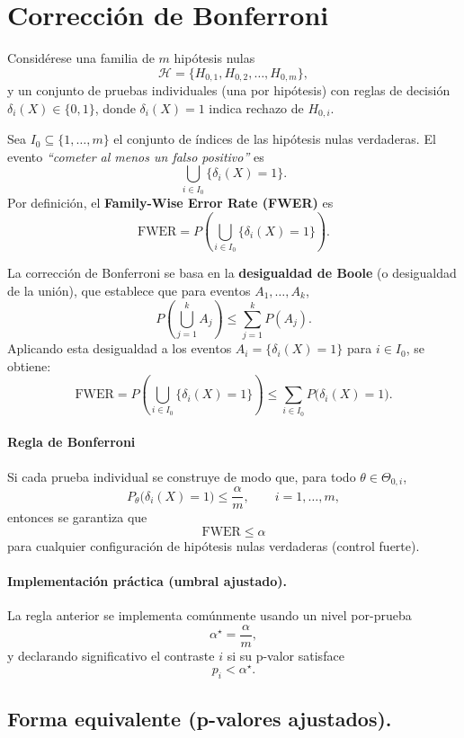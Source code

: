 \section{Correcci\'on de Bonferroni}

Consid\'erese una familia de $m$ hip\'otesis nulas
\[
\mathcal{H}=\{H_{0,1},H_{0,2},\dots,H_{0,m}\},
\]
y un conjunto de pruebas individuales (una por hip\'otesis) con reglas de decisi\'on $\delta_i(X)\in\{0,1\}$, donde $\delta_i(X)=1$ indica rechazo de $H_{0,i}$.

Sea $I_0\subseteq\{1,\dots,m\}$ el conjunto de \'indices de las hip\'otesis nulas verdaderas. El evento \emph{``cometer al menos un falso positivo''} es
\[
\bigcup_{i\in I_0}\{\delta_i(X)=1\}.
\]
Por definici\'on, el \textbf{Family-Wise Error Rate (FWER)} es
\[
\mathrm{FWER}
=
P\!\left(\bigcup_{i\in I_0}\{\delta_i(X)=1\}\right).
\]

La correcci\'on de Bonferroni se basa en la \textbf{desigualdad de Boole} (o desigualdad de la uni\'on), que establece que para eventos $A_1,\dots,A_k$,
\[
P\!\left(\bigcup_{j=1}^k A_j\right)\le \sum_{j=1}^k P(A_j).
\]
Aplicando esta desigualdad a los eventos $A_i=\{\delta_i(X)=1\}$ para $i\in I_0$, se obtiene:
\[
\mathrm{FWER}
=
P\!\left(\bigcup_{i\in I_0}\{\delta_i(X)=1\}\right)
\le
\sum_{i\in I_0} P\big(\delta_i(X)=1\big).
\]

\paragraph{Regla de Bonferroni}
Si cada prueba individual se construye de modo que, para todo $\theta\in\Theta_{0,i}$,
\[
P_\theta\big(\delta_i(X)=1\big)\le \frac{\alpha}{m},
\qquad i=1,\dots,m,
\]
entonces se garantiza que
\[
\mathrm{FWER}\le \alpha
\]
para cualquier configuraci\'on de hip\'otesis nulas verdaderas (control fuerte).

\paragraph{Implementaci\'on pr\'actica (umbral ajustado).}
La regla anterior se implementa com\'unmente usando un nivel por-prueba
\[
\alpha^\star=\frac{\alpha}{m},
\]
y declarando significativo el contraste $i$ si su p-valor satisface
\[
p_i < \alpha^\star.
\]

\subsection{Forma equivalente (p-valores ajustados).}

